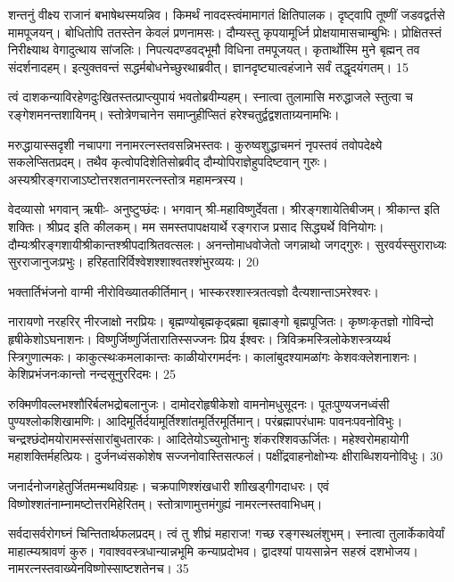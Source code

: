 शन्तनुं वीक्ष्य राजानं बभाषेथस्मयन्निव।
किमर्थं नावदस्त्वंमामागतं क्षितिपालक।
दृष्ट्वापि तूष्णीं जडवद्वर्तसे मामपूजयन्।
बोधितोपि ततस्तेन केवलं प्रणनामसः।
दौम्यस्तु कृपयामूर्ध्नि प्रोक्षयामासचाम्बुभिः।
प्रोक्षितस्तं निरीक्ष्याथ वेगादुत्थाय सांजलिः।
निपत्यदण्डवद्भूमौ विधिना तमपूजयत्।
कृतार्थोस्मि मुने बृह्मन् तव संदर्शनादहम्।
इत्युक्तवन्तं सद्धर्मबोधनेच्छुरथाब्रवीत्।
ज्ञानदृष्ट्यात्वहंजाने सर्वं तद्धृदयंगतम्।
15

त्वं दाशकन्याविरहेणदुःखितस्तत्प्राप्त्युपायं भवतोब्रवीम्यहम्।
स्नात्वा तुलामासि मरुद्धाजले स्तुत्वा च रङ्गेशमनन्तशायिनम्।
स्तोत्रेणचानेन समाप्नुहीप्सितं हरेश्चतुर्द्वद्वशताग्र्यनामभिः।

मरुद्धायास्सदृशी नचापगा ननामरत्नस्तवसन्निभस्तवः।
कुरुष्वशुद्धाचमनं नृपस्तवं तवोपदेक्ष्ये सकलेप्सितप्रदम्।
तथैव कृत्वोपदिशेतिसोब्रवीद् दौम्योपिराज्ञेहुपदिष्टवान्
गुरुः।
अस्यश्रीरङ्गराजाऽष्टोत्तरशतनामरत्नस्तोत्र
महामन्त्रस्य।

वेदव्यासो भगवान् ऋषीः- अनुष्टुप्छंदः।
भगवान् श्री-महाविष्णुर्देवता।
श्रीरङ्गशायेतिबीजम्।
श्रीकान्त इति शक्तिः।
श्रीप्रद इति कीलकम्।
मम समस्तपापक्षयार्थे रङ्गराज प्रसाद सिद्ध्यर्थे विनियोगः।
दौम्यःश्रीरङ्गशायीश्रीकान्तश्श्रीपदाश्रितवत्सलः।
अनन्तोमाधवोजेतो जगन्नाथो जगद्गुरुः।
सुरवर्यस्सुराराध्यः सुरराजानुजःप्रभुः।
हरिहतारिर्विश्वेशश्शाश्वतश्शंभुरव्ययः।
20

भक्तार्तिभंजनो वाग्मी नीरोविख्यातकीर्तिमान्।
भास्करश्शास्त्रतत्वज्ञो दैत्यशान्ताऽमरेश्वरः।

नारायणो नरहरिर् नीरजाक्षो नरप्रियः।
बृह्मण्योबृह्मकृद्ब्रह्मा बृह्माङ्गो बृह्मपूजितः।
कृष्णःकृतज्ञो गोविन्दो हृषीकेशोऽघनाशनः।
विष्णुर्जिष्णुर्जितारातिस्सज्जनः प्रिय ईश्वरः।
त्रिविक्रमस्त्रिलोकेशस्त्रय्यर्थ स्त्रिगुणात्मकः।
काकुत्स्थःकमलाकान्तः काळीयोरगमर्दनः।
कालांबुदश्यामळांगः केशवःक्लेशनाशनः।
केशिप्रभंजनःकान्तो नन्दसूनुररिदमः।
25

रुक्मिणीवल्लभश्शौरिर्बलभद्रोबलानुजः।
दामोदरोहृषीकेशो वामनोमधुसूदनः।
पूतःपुण्यजनध्वंसी पुण्यश्लोकशिखामणिः।
आदिमूर्तिर्दयामूर्तिश्शांतमूर्तिरमूर्तिमान्।
परंब्रह्मापरंधामः पावनःपवनोविभुः।
चन्द्रश्छंदोमयोरामस्संसारांबुधतारकः।
आदितेयोऽच्युतोभानुः शंकरश्शिवऊर्जितः।
महेश्वरोमहायोगी महाशक्तिर्महत्प्रियः।
दुर्जनध्वंसकोशेष सज्जनोवास्तिसत्फलं।
पक्षींद्रवाहनोक्षोभ्यः क्षीराब्धिशयनोविधुः।
30

जनार्दनोजगहेतुर्जितमन्मथविग्रहः।
चक्रपाणिश्शंखधारी शाीखड्गीगदाधरः।
एवं विष्णोश्शतंनाम्नामष्टोत्तरमिहेरितम्।
स्तोत्राणामुत्तमंगुह्यं नामरत्नस्तवाभिधम्।

सर्वदासर्वरोगघ्नं चिन्तितार्थफलप्रदम्।
त्वं तु शीघ्रं महाराज! गच्छ रङ्गस्थलंशुभम्।
स्नात्वा तुलार्केकावेर्यां माहात्म्यश्रावणं कुरु।
गवाश्ववस्त्रधान्यान्नभूमि कन्याप्रदोभव।
द्वादश्यां पायसान्नेन सहस्रं दशभोजय।
नामरत्नस्तवाख्येनविष्णोस्साष्टशतेनच।
35

